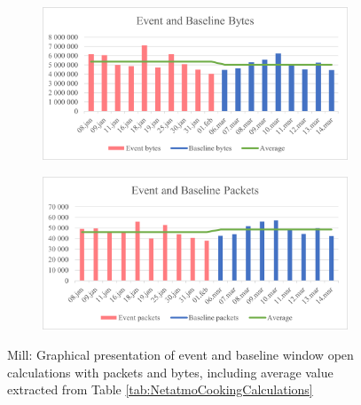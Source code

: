 \begin{figure}[H]
    \centering
    \begin{subfigure}{0.8\textwidth}
        \centering
        \includegraphics[width=1\hsize]{figures/Mill_Window_Calculations_Bytes.png} 
    \end{subfigure}
    \begin{subfigure}{0.8\textwidth}
        \centering
        \includegraphics[width=1\hsize]{figures/Mill_Window_Calculations_Packets.png} 
    \end{subfigure}
    \caption{Mill: Graphical presentation of event and baseline window open calculations with packets and bytes, including average value extracted from Table \ref{tab:NetatmoCookingCalculations}}
    \label{fig:MillWindowCalculations}
\end{figure}

